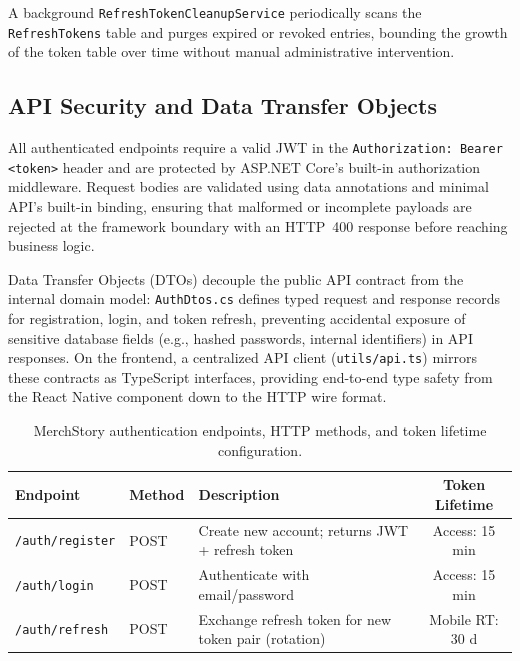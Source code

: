 \documentclass[12pt, a4paper]{report}
\begin{document}
\medskip\noindent
A background \texttt{RefreshTokenCleanupService} periodically scans the
\texttt{RefreshTokens} table and purges expired or revoked entries,
bounding the growth of the token table over time without manual
administrative intervention.

\subsection{API Security and Data Transfer Objects}

All authenticated endpoints require a valid JWT in the
\texttt{Authorization: Bearer <token>} header and are protected by
ASP.NET Core's built-in authorization middleware.  Request bodies are
validated using data annotations and minimal API's built-in binding,
ensuring that malformed or incomplete payloads are rejected at the
framework boundary with an HTTP~400 response before reaching business
logic.

\medskip\noindent
Data Transfer Objects (DTOs) decouple the public API contract from the
internal domain model: \texttt{AuthDtos.cs} defines typed request and
response records for registration, login, and token refresh, preventing
accidental exposure of sensitive database fields (e.g., hashed passwords,
internal identifiers) in API responses.  On the frontend, a centralized
API client (\texttt{utils/api.ts}) mirrors these contracts as TypeScript
interfaces, providing end-to-end type safety from the React Native
component down to the HTTP wire format.

\begin{table}[H]
  \centering
  \caption{MerchStory authentication endpoints, HTTP methods, and token
    lifetime configuration.}
  \label{tab:auth-endpoints}
  \begin{tabularx}{\textwidth}{@{} l l X c @{}}
    \toprule
    \textbf{Endpoint}      & \textbf{Method} & \textbf{Description}
      & \textbf{Token Lifetime} \\
    \midrule
    \texttt{/auth/register} & POST  & Create new account; returns JWT + refresh token
      & Access: 15 min \\
    \texttt{/auth/login}    & POST  & Authenticate with email/password
      & Access: 15 min \\
    \texttt{/auth/refresh}  & POST  & Exchange refresh token for new token pair (rotation)
      & Mobile RT: 30 d \\
    \bottomrule
  \end{tabularx}
\end{table}
\end{document}
